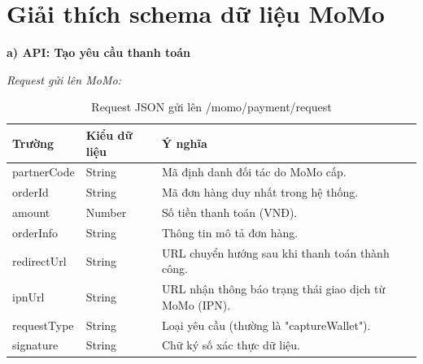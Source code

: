 \section{Giải thích schema dữ liệu MoMo}


\textbf{a) API: Tạo yêu cầu thanh toán}

\textit{Request gửi lên MoMo:}
\begin{table}[H]
    \centering
    \caption{Request JSON gửi lên /momo/payment/request}
    \begin{tabular}{|p{4cm}|p{2.5cm}|p{7cm}|}
        \hline
        \textbf{Trường} & \textbf{Kiểu dữ liệu} & \textbf{Ý nghĩa} \\
        \hline
        partnerCode & String & Mã định danh đối tác do MoMo cấp. \\
        \hline
        orderId & String & Mã đơn hàng duy nhất trong hệ thống. \\
        \hline
        amount & Number & Số tiền thanh toán (VNĐ). \\
        \hline
        orderInfo & String & Thông tin mô tả đơn hàng. \\
        \hline
        redirectUrl & String & URL chuyển hướng sau khi thanh toán thành công. \\
        \hline
        ipnUrl & String & URL nhận thông báo trạng thái giao dịch từ MoMo (IPN). \\
        \hline
        requestType & String & Loại yêu cầu (thường là "captureWallet"). \\
        \hline
        signature & String & Chữ ký số xác thực dữ liệu. \\
        \hline
    \end{tabular}
\end{table}


